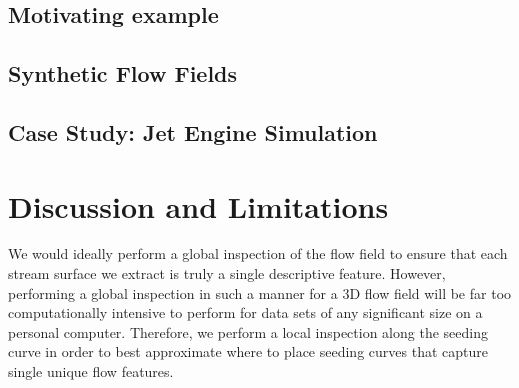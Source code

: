 \documentclass{vgtc}                          %
\begin{document}
\subsection{Motivating example}

\subsection{Synthetic Flow Fields}

\subsection{Case Study: Jet Engine Simulation}

\section{Discussion and Limitations}

We would ideally perform a global inspection of the flow field to ensure that each stream surface we extract is truly a single descriptive feature.
However, performing a global inspection in such a manner for a 3D flow field will be far too computationally intensive to perform for data sets of any significant size on a personal computer.
Therefore, we perform a local inspection along the seeding curve in order to best approximate where to place seeding curves that capture single unique flow features.




\end{document}
